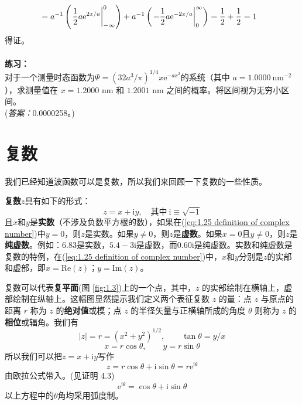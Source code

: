 \begin{examplebox}
\begin{equation*}
\begin{aligned}
				& = a^{-1}\left(\eval{\frac{1}{2}a\mathrm{e}^{2x/a}}_{-\infty}^{0}\right) + a^{-1}\left(\eval{-\frac{1}{2}a\mathrm{e}^{-2x/a}}_{0}^{\infty}\right) = \frac{1}{2} + \frac{1}{2} = 1 
			\end{aligned}
		\end{equation*}
		得证。\\
		\\
		\noindent \textbf{练习：}\\
		对于一个测量时态函数为$\Psi = \left(32 a^3 /\pi \right)^{1/4} x \mathrm{e}^{-ax^2}$的系统（其中 $a = 1.0000 \: \text{nm}^{-2}$），求测量值在 $x = 1.2000$ nm 和 $1.2001$ nm 之间的概率。将区间视为无穷小区间。\\
		(\textit{答案：}0.0000258。)
	\end{examplebox}
	
	\section{复数}
	\label{sec:1.7 Complex Numbers}
	我们已经知道波函数可以是复数，所以我们来回顾一下复数的一些性质。

	\textbf{复数}$z$具有如下的形式：
	\begin{equation}
		z = x+\mathrm{i}y, \quad \text{其中} \: \mathrm{i}  \equiv \sqrt{-1}
		\label{eq:1.25 definition of complex number}
	\end{equation}
	且$x$和$y$是\textbf{实数}（不涉及负数平方根的数），如果在(\ref{eq:1.25 definition of complex number})中$y=0$，则$z$是实数。如果$y \neq 0$，则$z$是\textbf{虚数}。如果$x=0$且$y \neq 0$，则$z$是\textbf{纯虚数}。例如：6.83是实数，$5.4-3\mathrm{i}$是虚数，而$0.60\mathrm{i}$是纯虚数。实数和纯虚数是复数的特例，在(\ref{eq:1.25 definition of complex number})中，$x$和$y$分别是$z$的实部和虚部，即$x = \mathrm{Re} \left(z\right)$；$y = \mathrm{Im}\left(z\right)$。

	复数可以代表\textbf{复平面}(图 \ref{fig:1.3})上的一个点，其中，$z$ 的实部绘制在横轴上，虚部绘制在纵轴上。这幅图显然提示我们定义两个表征复数 $z$ 的量：点 $z$ 与原点的距离 $r$ 称为 $z$ 的\textbf{绝对值}或模；点 $z$ 的半径矢量与正横轴所成的角度 $\theta$ 则称为 $z$ 的\textbf{相位}或辐角。我们有
	\begin{equation}
		\left|z\right| = r = \left(x^2+y^2\right)^{1/2}, \qquad \tan \theta = y/x
		\label{eq:1.26 definition of phase and absolute value}
	\end{equation}
	\begin{equation*}
		x = r \cos \theta, \qquad y = r \sin \theta
	\end{equation*}
	所以我们可以把$z = x+ \mathrm{i}y$写作
	\begin{equation}
		z = r \cos \theta + \mathrm{i} \sin \theta = r \mathrm{e}^{\mathrm{i} \theta}
		\label{eq:1.27 Triangular forms of complex numbers}
	\end{equation}	
	由欧拉公式带入。(见证明 4.3)
	\begin{equation}
		\boxed{\mathrm{e}^{\mathrm{i}\theta} = \cos \theta + \mathrm{i} \sin\theta}
		\label{eq:1.28 Euler's equation}
	\end{equation}
	以上方程中的$\theta$角均采用弧度制。

